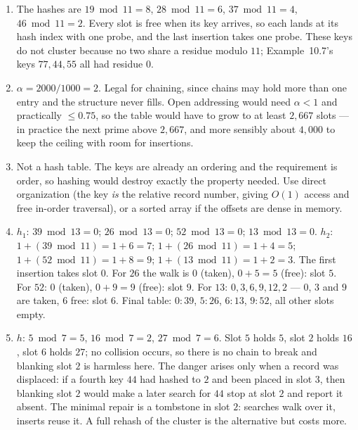 \documentclass[11pt]{article}
\begin{document}
\begingroup\small
\begin{enumerate}
  \item The hashes are $19 \bmod 11 = 8$, $28 \bmod 11 = 6$, $37 \bmod 11 = 4$, $46 \bmod 11 = 2$. Every slot is free when its key arrives, so each lands at its hash index with one probe, and the last insertion takes one probe. These keys do not cluster because no two share a residue modulo $11$; Example~10.7's keys $77, 44, 55$ all had residue $0$.
  \item $\alpha = 2000/1000 = 2$. Legal for chaining, since chains may hold more than one entry and the structure never fills. Open addressing would need $\alpha < 1$ and practically $\le 0.75$, so the table would have to grow to at least $2{,}667$ slots --- in practice the next prime above $2{,}667$, and more sensibly about $4{,}000$ to keep the ceiling with room for insertions.
  \item Not a hash table. The keys are already an ordering and the requirement is order, so hashing would destroy exactly the property needed. Use direct organization (the key \emph{is} the relative record number, giving $O(1)$ access and free in-order traversal), or a sorted array if the offsets are dense in memory.
  \item $h_1$: $39 \bmod 13 = 0$; $26 \bmod 13 = 0$; $52 \bmod 13 = 0$; $13 \bmod 13 = 0$. $h_2$: $1 + (39 \bmod 11) = 1+6 = 7$; $1 + (26 \bmod 11) = 1+4 = 5$; $1 + (52 \bmod 11) = 1+8 = 9$; $1 + (13 \bmod 11) = 1+2 = 3$. The first insertion takes slot $0$. For $26$ the walk is $0$ (taken), $0+5 = 5$ (free): slot $5$. For $52$: $0$ (taken), $0+9 = 9$ (free): slot $9$. For $13$: $0, 3, 6, 9, 12, 2$ --- $0$, $3$ and $9$ are taken, $6$ free: slot $6$. Final table: $0{:}39$, $5{:}26$, $6{:}13$, $9{:}52$, all other slots empty.
  \item $h$: $5 \bmod 7 = 5$, $16 \bmod 7 = 2$, $27 \bmod 7 = 6$. Slot $5$ holds $5$, slot $2$ holds $16$, slot $6$ holds $27$; no collision occurs, so there is no chain to break and blanking slot $2$ is harmless here. The danger arises only when a record was displaced: if a fourth key $44$ had hashed to $2$ and been placed in slot $3$, then blanking slot $2$ would make a later search for $44$ stop at slot $2$ and report it absent. The minimal repair is a tombstone in slot $2$: searches walk over it, inserts reuse it. A full rehash of the cluster is the alternative but costs more.
\end{enumerate}
\endgroup



\end{document}
